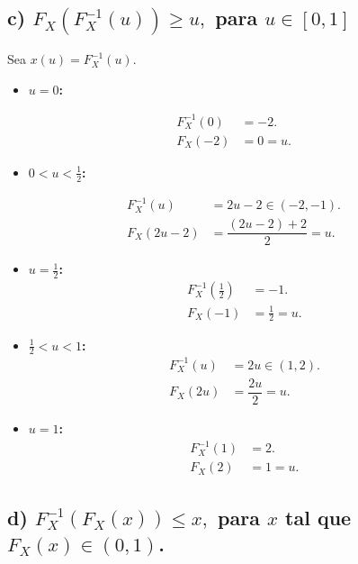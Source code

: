 \documentclass[10pt,a4paper]{article}
\providecommand{\tightlist}{%
      \setlength{\itemsep}{0pt}\setlength{\parskip}{0pt}}
\begin{document}
    \hypertarget{c-f_xf-1_xu-geq-u-para-u-in-01}{%
\subsection{\texorpdfstring{c) \(F_{X}(F^{-1}_X(u)) \geq u,\) para
\(u \in [0,1]\)}{c) F\_\{X\}(F\^{}\{-1\}\_X(u)) \textbackslash geq u, para u \textbackslash in {[}0,1{]}}}\label{c-f_xf-1_xu-geq-u-para-u-in-01}}

    Sea \(x(u)=F_X^{-1}(u)\).

\begin{itemize}
\tightlist
\item
  \textbf{\(u=0\):}
\end{itemize}

\[
\begin{align*}
F_X^{-1}(0)&=-2. \\
F_X(-2)&=0=u.
\end{align*}
\]

\begin{itemize}
\tightlist
\item
  \textbf{\(0<u<\tfrac12\):}
\end{itemize}

\[
\begin{align*}
F_X^{-1}(u) & =2u-2\in(-2,-1). \\
F_X(2u-2) & =\dfrac{(2u-2)+2}{2}=u.
\end{align*}
\]

\begin{itemize}
\item
  \textbf{\(u=\tfrac12\):} \[
  \begin{align*}
  F_X^{-1}(\tfrac12) & =-1. \\
  F_X(-1) & =\tfrac12=u.
  \end{align*}
  \]
\item
  \textbf{\(\tfrac12<u<1\):} \[
  \begin{align*}
  F_X^{-1}(u) & =2u\in(1,2). \\
  F_X(2u) & =\dfrac{2u}{2}=u.
  \end{align*}
  \]
\item
  \textbf{\(u=1\):} \[
  \begin{align*}
  F_X^{-1}(1) & =2. \\
  F_X(2) & =1=u.
  \end{align*}
  \]
\end{itemize}

    \hypertarget{d-f_x-1f_xx-leq-x-para-x-tal-que-f_xx-in-0-1.}{%
\subsection{\texorpdfstring{d) \(F_{X}^{-1}(F_X(x)) \leq x,\) para \(x\)
tal que
\(F_X(x) \in (0, 1)\).}{d) F\_\{X\}\^{}\{-1\}(F\_X(x)) \textbackslash leq x, para x tal que F\_X(x) \textbackslash in (0, 1).}}\label{d-f_x-1f_xx-leq-x-para-x-tal-que-f_xx-in-0-1.}}
\end{document}
